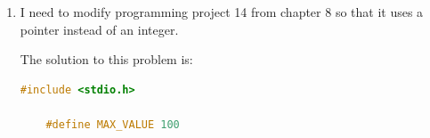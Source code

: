 \documentclass[12pt]{article}
\begin{document}
\begin{enumerate}[1.]
    I need to simplify programming project 2(b) by taking advantage of the fact that
    array name can be used as a pointer.

    \bigskip

    The solution to this problem is:

    \bigskip

\begin{lstlisting}[language=c]
    #include <stdio.h>
    #include <stdbool.h>
    #include <ctype.h>

    #define SIZE 100

    bool is_palindrome(char *p, char *q);

    int main(void) {
        char c, array[SIZE],
             *p = array,
             *q = array;

        // Read characters
        // Put characters into array
        printf("Enter a message: ");

        do {
            c = getchar();

            if (c == '\n') {
                break;
            }

            if (!isalpha(c)) {
                continue;
            }

            *q++ = tolower(c);
        } while (q < array + SIZE);
        // Set pointer to last element in the array
        q--;
        // Check if characters in array is palindrome
        if (is_palindrome(p,q)) {
            printf("Palindrome");
        } else {
            printf("Not a Palindrome");
        }

        return 0;
    }

    bool is_palindrome(char *p, char *q) {
        while (p < q) {
            if (*p++ != *q--) {
                return false;
            }
        }

        return true;
    }
\end{lstlisting}

    \item

    I need to modify programming project 14 from chapter 8 so that it uses a pointer
    instead of an integer.

    \bigskip

    The solution to this problem is:

    \bigskip

\begin{lstlisting}[language=c]
    #include <stdio.h>

    #define MAX_VALUE 100


\end{lstlisting}
\end{enumerate}
\end{document}
